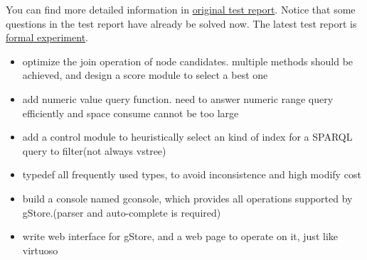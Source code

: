 \documentclass[titlepage, a4paper, 12pt]{article}
\begin{document}
You can find more detailed information in \href{run:../pdf/gstore_test_report.pdf}{original test report}. Notice that some questions in the test report have already be solved now.
The latest test report is \href{run:../test/formal_experiment.pdf}{formal experiment}.

\clearpage



\begin{itemize}
\item
  optimize the join operation of node candidates. multiple methods
  should be achieved, and design a score module to select a best one
\item
  add numeric value query function. need to answer numeric range query
  efficiently and space consume cannot be too large
\item
  add a control module to heuristically select an kind of index for a
  SPARQL query to filter(not always vstree)
\item
  typedef all frequently used types, to avoid inconsistence and high
  modify cost
\end{itemize}


\begin{itemize}
\item
  build a console named gconsole, which provides all operations
  supported by gStore.(parser and auto-complete is required)
\item
  write web interface for gStore, and a web page to operate on it, just
  like virtuoso
\end{itemize}

\end{document}
